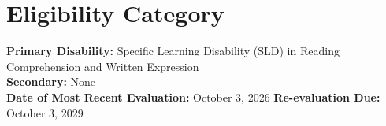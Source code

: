 \section{Eligibility Category}

\begin{iepbox}
{\bfseries\color{IEPNavy} Primary Disability:} Specific Learning Disability (SLD) in Reading Comprehension and Written Expression\\[2pt]
{\bfseries\color{IEPNavy} Secondary:} None\\[2pt]
{\bfseries\color{IEPNavy} Date of Most Recent Evaluation:} October 3, 2026 \hfill
{\bfseries\color{IEPNavy} Re-evaluation Due:} October 3, 2029
\end{iepbox}
